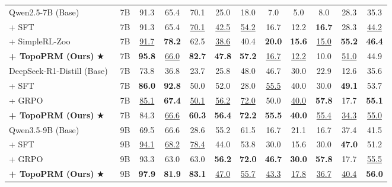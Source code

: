 \begin{table}[!htb]
{\begin{tabular}{@{}l c ccc cc ccc c c@{}}
\midrule
\rowcolor{gray!10}
Qwen2.5-7B (Base)~\cite{yang2024qwen2_5}     & 7B & 91.3 & 65.4 & 70.1 & 25.0 & 18.0 & 7.0  & 5.0  & 8.0  & 28.3 & 35.3 \\
\quad + SFT & 7B & 91.3 & 65.4 & \underline{70.1} & \underline{42.5} & \underline{54.2} & 16.7 & 12.2 & \textbf{16.7} & 28.3 & \underline{44.2} \\
\quad + SimpleRL-Zoo~\cite{zeng2503simplerlzoo} & 7B & \underline{91.7} & \textbf{78.2} & 62.5 & \underline{38.6} & 40.4 & \textbf{20.0} & \textbf{15.6} & \underline{15.0} & \textbf{55.2} & \textbf{46.4} \\
\rowcolor{blue!6}
\quad \textbf{+ TopoPRM (Ours) }      $\bigstar$                  & 7B & \textbf{95.8} & \underline{66.0} & \textbf{82.7} & \textbf{47.8} & \textbf{57.2} & \underline{16.7} & \underline{12.2} & 10.0 & \underline{51.0} & 44.9 \\
\midrule
\rowcolor{gray!10}
DeepSeek-R1-Distill (Base)~\cite{deepseekr1} & 7B & 73.8 & 36.8 & 23.7 & 25.8 & 48.0 & 46.7 & 30.0 & 22.9 & 12.6 & 35.6 \\
\quad + SFT                                  & 7B & \textbf{86.0} & \textbf{92.8} & 50.0 & 52.0 & 28.0 & \underline{55.5} & 40.0 & 30.0 & \textbf{49.1} & 53.7 \\
\quad + GRPO~\cite{shao2024deepseekmath}     & 7B & \underline{85.1} & \textbf{67.4} & \underline{50.1} & \underline{56.2} & \underline{72.0} & 50.0 & \underline{40.0} & \textbf{57.8} & 17.7 & \textbf{55.1} \\
\rowcolor{blue!6}
\quad \textbf{+ TopoPRM (Ours) }   $\bigstar$                     & 7B & 84.3 & \underline{66.6} & \textbf{60.3} & \textbf{56.4} & \textbf{72.2} & \textbf{55.5} & \textbf{40.0} & \underline{55.4} & \underline{34.3} & \underline{55.0} \\
\midrule
\rowcolor{gray!10}
Qwen3.5-9B (Base)                            & 9B & 69.5 & 66.6 & 28.6 & 55.2 & 61.5 & 16.7 & 21.1 & 16.7 & 37.4 & 41.5 \\
\quad + SFT                                  & 9B & \underline{94.1} & \underline{68.2} & \underline{78.4} & 44.0 & 53.8 & 30.0 & 15.6 & 30.0 & \textbf{47.0} & 51.2 \\
\quad + GRPO~\cite{shao2024deepseekmath}     & 9B & 93.3 & 63.0 & 63.0 & \textbf{56.2} & \textbf{72.0} & \textbf{46.7} & \textbf{30.0} & \textbf{57.8} & 17.7 & \underline{55.5} \\
\rowcolor{blue!6}
\quad \textbf{+ TopoPRM (Ours)  }  $\bigstar$                   & 9B & \textbf{97.9} & \textbf{81.9} & \textbf{83.1} & \underline{47.0} & \underline{55.7} & \underline{43.3} & \underline{17.8} & \underline{36.7} & \underline{40.4} & \textbf{56.0} \\
\bottomrule
\end{tabular}%
}
\end{table}